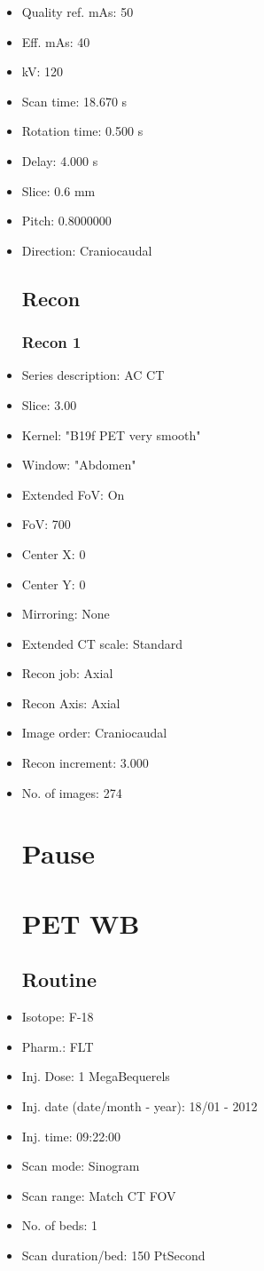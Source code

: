 \documentclass[12pt]{article}
\begin{document}
\begin{itemize}
\subsection{Scan}
\item Quality ref. mAs: 50\item Eff. mAs: 40\item kV: 120\item Scan time: 18.670 s\item Rotation time: 0.500 s\item Delay: 4.000 s\item Slice: 0.6 mm\item Pitch: 0.8000000\item Direction: Craniocaudal
\subsection{Recon}

\subsubsection{Recon 1}
\item Series description: AC CT
\item Slice: 3.00
\item Kernel: "B19f PET very smooth"
\item Window: "Abdomen"
\item Extended FoV: On
\item FoV: 700
\item Center X: 0
\item Center Y: 0
\item Mirroring: None
\item Extended CT scale: Standard
\item Recon job: Axial
\item Recon Axis: Axial
\item Image order: Craniocaudal
\item Recon increment: 3.000
\item No. of images: 274
\section{Pause}

\section{PET WB}
\subsection{Routine}
\item Isotope: F-18
\item Pharm.: FLT
\item Inj. Dose: 1 MegaBequerels
\item Inj. date (date/month - year): 18/01 - 2012
\item Inj. time: 09:22:00
\item Scan mode: Sinogram
\item Scan range: Match CT FOV
\item No. of beds: 1
\item Scan duration/bed: 150 PtSecond

\end{itemize}
\end{document}
